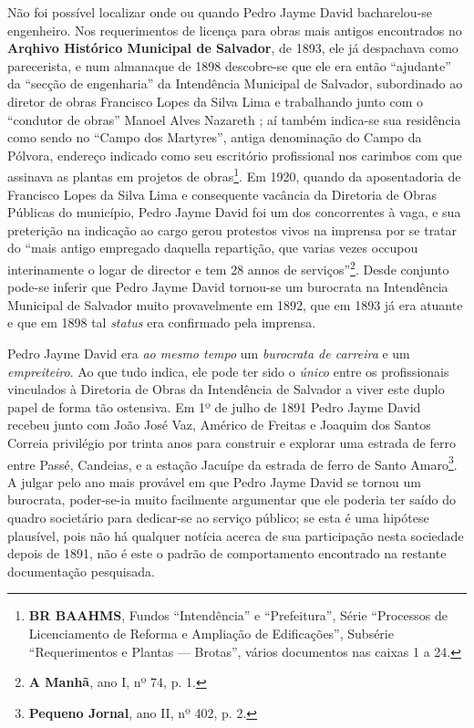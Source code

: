 Não foi possível localizar onde ou quando Pedro Jayme David bacharelou-se engenheiro. Nos requerimentos de licença para obras mais antigos encontrados no \textbf{Arqhivo Histórico Municipal de Salvador}, de 1893, ele já despachava como parecerista, e num almanaque de 1898 descobre-se que ele era então ``ajudante'' da ``secção de engenharia'' da Intendência Municipal de Salvador, subordinado ao diretor de obras Francisco Lopes da Silva Lima e trabalhando junto com o ``condutor de obras'' Manoel Alves Nazareth \cite[p.~278]{reis_almanak_1898}; aí também indica-se sua residência como sendo no ``Campo dos Martyres'', antiga denominação do Campo da Pólvora, endereço indicado como seu escritório profissional nos carimbos com que assinava as plantas em projetos de obras\footnote{\textbf{BR BAAHMS}, Fundos ``Intendência'' e ``Prefeitura'', Série ``Processos de Licenciamento de Reforma e Ampliação de Edificações'', Subsérie ``Requerimentos e Plantas --- Brotas'', vários documentos nas caixas 1 a 24.}. Em 1920, quando da aposentadoria de Francisco Lopes da Silva Lima e consequente vacância da Diretoria de Obras Públicas do município, Pedro Jayme David foi um dos concorrentes à vaga, e sua preterição na indicação ao cargo gerou protestos vivos na imprensa por se tratar do ``mais antigo empregado daquella repartição, que varias vezes occupou interinamente o logar de director e tem 28 annos de serviços''\footnote{\textbf{A Manhã}, ano I, nº 74, p. 1.}. Desde conjunto pode-se inferir que Pedro Jayme David tornou-se um burocrata na Intendência Municipal de Salvador muito provavelmente em 1892, que em 1893 já era atuante e que em 1898 tal \textit{status} era confirmado pela imprensa.

Pedro Jayme David era \textit{ao mesmo tempo} um \textit{burocrata de carreira} e um \textit{empreiteiro}. Ao que tudo indica, ele pode ter sido o \textit{único} entre os profissionais vinculados à Diretoria de Obras da Intendência de Salvador a viver este duplo papel de forma tão ostensiva. Em 1º de julho de 1891 Pedro Jayme David recebeu junto com João José Vaz, Américo de Freitas e Joaquim dos Santos Correia privilégio por trinta anos para construir e explorar uma estrada de ferro entre Passé, Candeias, e a estação Jacuípe da estrada de ferro de Santo Amaro\footnote{\textbf{Pequeno Jornal}, ano II, nº 402, p. 2.}. A julgar pelo ano mais provável em que Pedro Jayme David se tornou um burocrata, poder-se-ia muito facilmente argumentar que ele poderia ter saído do quadro societário para dedicar-se ao serviço público; se esta é uma hipótese plausível, pois não há qualquer notícia acerca de sua participação nesta sociedade depois de 1891, não é este o padrão de comportamento encontrado na restante documentação pesquisada. 

